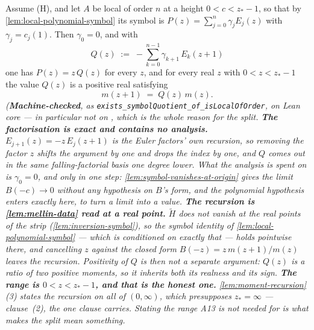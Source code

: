 \begin{lemma}
\label{lem:moment-recursion-quotient}
\leanok
Assume (H), and let $A$ be local of order $n$ at a height $0 < c < z_* - 1$, so that by
\ref{lem:local-polynomial-symbol} its symbol is $P(z) = \sum_{j=0}^{n}\gamma_j E_j(z)$ with
$\gamma_j = c_j(1)$. Then $\gamma_0 = 0$, and with
\[
  Q(z) \;:=\; -\sum_{k=0}^{n-1}\gamma_{k+1}\,E_k(z+1)
\]
one has $P(z) = z\,Q(z)$ for every $z$, and for every real $z$ with $0 < z < z_* - 1$ the value
$Q(z)$ is a positive real satisfying
\[
  m(z+1) \;=\; Q(z)\,m(z).
\]
\statusT\quad\emph{(\textbf{Machine-checked}, as
\texttt{exists\_symbolQuotient\_of\_isLocalOfOrder}, on Lean core --- in particular not
on , which is the whole reason for the split.
\textbf{The factorisation is exact and contains no analysis.} $E_{j+1}(z) = -z\,E_j(z+1)$ is the
Euler factors' own recursion, so removing the factor $z$ shifts the argument by one and drops the
index by one, and $Q$ comes out in the same falling-factorial basis one degree lower. What the
analysis is spent on is $\gamma_0 = 0$, and only in one step: \ref{lem:symbol-vanishes-at-origin}
gives the limit $B(-c) \to 0$ without any hypothesis on $B$'s form, and the polynomial hypothesis
enters exactly here, to turn a limit into a value.
\textbf{The recursion is \ref{lem:mellin-data} read at a real point.} $\tilde H$ does not vanish
at the real points of the strip (\ref{lem:inversion-symbol}), so the symbol identity of
\ref{lem:local-polynomial-symbol} --- which is conditioned on exactly that --- holds pointwise
there, and cancelling $z$ against the closed form $B(-z) = z\,m(z+1)/m(z)$ leaves the recursion.
Positivity of $Q$ is then not a separate argument: $Q(z)$ \emph{is} a ratio of two positive
moments, so it inherits both its realness and its sign.
\textbf{The range is $0 < z < z_* - 1$, and that is the honest one.}
\ref{lem:moment-recursion}(3) states the recursion on all of $(0,\infty)$, which presupposes
$z_* = \infty$ --- clause~(2), the one clause  carries. Stating the range A13 is not
needed for is what makes the split mean something.
}
\end{lemma}
